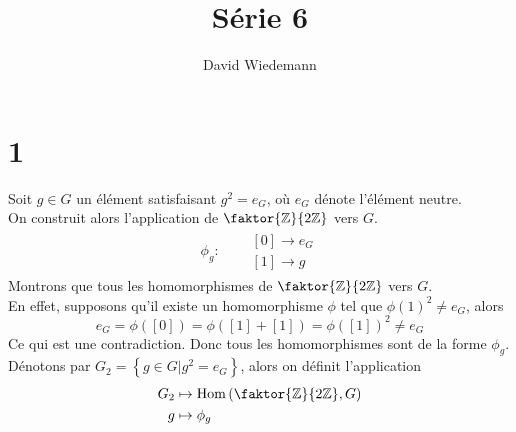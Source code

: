 \documentclass[11pt, a4paper, twoside]{article}
\DeclareMathOperator*{\Hom}{Hom}
\begin{document}
\title{Série 6}
\author{David Wiedemann}
\maketitle
\section*{1}
Soit $g \in G$ un élément satisfaisant $g^{2}= e_G$, où $e_G$ dénote l'élément neutre.\\
On construit alors l'application de $\faktor { \mathbb{Z}} { 2\mathbb{Z}}$ vers $G$.\\
\begin{align*}
	\phi_g: & 
	\begin{array}{ll}
	\quad [ 0 ] \to e_G\\
	\quad [ 1 ] \to g
	\end{array}
\end{align*}
Montrons que tous les homomorphismes de $\faktor { \mathbb{Z}} { 2\mathbb{Z}}$ vers $G$.\\
En effet, supposons qu'il existe un homomorphisme $\phi$ tel que $\phi( 1) ^{2}\neq e_G$, alors 
\[ 
	e_G = \phi( [ 0] ) =	\phi( [ 1 ]+[ 1 ])  = \phi( [ 1] ) ^{2} \neq e_G
\]
Ce qui est une contradiction. Donc tous les homomorphismes sont de la forme $\phi_g$.\\
Dénotons par $G_2= \left\{ g \in G | g^{2} = e_G \right\} $, alors on définit l'application
\begin{align*}
	G_2 &\mapsto \Hom\left( \faktor { \mathbb{Z}} { 2\mathbb{Z}},G\right)  \\
	g &\mapsto \phi_g\\
\end{align*}
\end{document}

